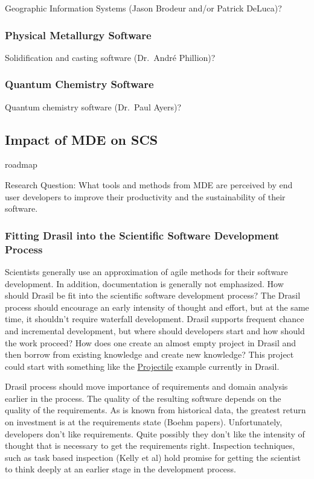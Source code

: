 \documentclass[12pt]{article}
\begin{document}
Geographic Information Systems (Jason Brodeur and/or Patrick DeLuca)?

\subsubsection{Physical Metallurgy Software}

Solidification and casting software (Dr.\ Andr\'e Phillion)?

\subsubsection{Quantum Chemistry Software}

Quantum chemistry software (Dr.\ Paul Ayers)?

\subsection{Impact of MDE on SCS} \label{SecImpactMDE}

roadmap

Research Question: What tools and methods from MDE are perceived by end user developers to
  improve their productivity and the sustainability of their software.

\subsubsection{Fitting Drasil into the Scientific Software Development Process} \label{Sec}

Scientists generally use an approximation of agile methods for their software
development.  In addition, documentation is generally not emphasized.  How
should Drasil be fit into the scientific software development process?  The
Drasil process should encourage an early intensity of thought and effort, but at
the same time, it shouldn't require waterfall development.  Drasil supports
frequent chance and incremental development, but where should developers start
and how should the work proceed?  How does one create an almost empty project in
Drasil and then borrow from existing knowledge and create new knowledge?  This
project could start with something like the
\href{https://jacquescarette.github.io/Drasil/examples/Projectile/srs/Projectile_SRS.html}
{Projectile} example currently in Drasil.

Drasil process should move importance of requirements and domain analysis
earlier in the process.  The quality of the resulting software depends on the
quality of the requirements.  As is known from historical data, the greatest
return on investment is at the requirements state (Boehm papers).
Unfortunately, developers don't like requirements.  Quite possibly they don't
like the intensity of thought that is necessary to get the requirements right.
Inspection techniques, such as task based inspection (Kelly et al) hold promise
for getting the scientist to think deeply at an earlier stage in the development
process.
\end{document}
